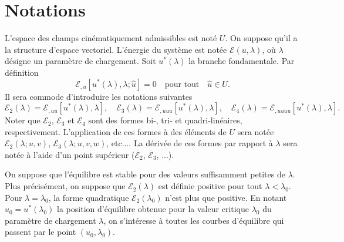 \documentclass[12pt, final]{amsart}
\begin{document}
\title{\sbtitle}
\author{\sbauthor}
\address{\sbaddress}

\begin{abstract}
  blabla
\end{abstract}

\maketitle

\section{Notations}

L'espace des champs cinématiquement admissibles est noté $U$. On
suppose qu'il a la structure d'espace vectoriel. L'énergie du système
est notée $\mathcal{E} (u, \lambda)$, où $\lambda$ désigne un
paramètre de chargement. Soit $u^{\ast} (\lambda)$ la branche
fondamentale. Par définition
\begin{equation}
  \mathcal{E}_{, u} [u^{\ast} (\lambda), \lambda ; \hat{u}] = 0 \quad
  \text{pour tout} \quad \hat{u} \in U.
\end{equation}
Il sera commode d'introduire les notations suivantes
\begin{equation}
  \mathcal{E}_2 (\lambda) =\mathcal{E}_{, u  u}  [u^{\ast} (\lambda),
  \lambda], \quad \mathcal{E}_3 (\lambda) =\mathcal{E}_{, u  u
   u} [u^{\ast} (\lambda), \lambda], \quad \mathcal{E}_4 (\lambda)
  =\mathcal{E}_{, u  u  u  u} [u^{\ast} (\lambda),
  \lambda] .
\end{equation}
Noter que $\mathcal{E}_2$, $\mathcal{E}_3$ et $\mathcal{E}_4$ sont des formes
bi-, tri- et quadri-linéaires, respectivement. L'application de ces formes
à des éléments de $U$ sera notée $\mathcal{E}_2 (\lambda ; u,
v)$, $\mathcal{E}_3 (\lambda ; u, v, w)$, etc.... La dérivée de ces
formes par rapport à $\lambda$ sera notée à l'aide d'un point
supérieur ($\dot{\mathcal{E}_2}$, $\dot{\mathcal{E}_3}$, ...).

On suppose que l'équilibre est stable pour des valeurs suffisamment
petites de $\lambda$. Plus précisément, on suppose que $\mathcal{E}_2
(\lambda)$ est définie positive pour tout $\lambda < \lambda_0$. Pour
$\lambda = \lambda_0$, la forme quadratique $\mathcal{E}_2 (\lambda_0)$ n'est
plus que positive. En notant $u_0 = u^{\ast} (\lambda_0)$ la position
d'équilibre obtenue pour la valeur critique $\lambda_0$ du paramètre
de chargement $\lambda$, on s'intéresse à toutes les courbes
d'équilibre qui passent par le point $(u_0, \lambda_0)$.
\end{document}
